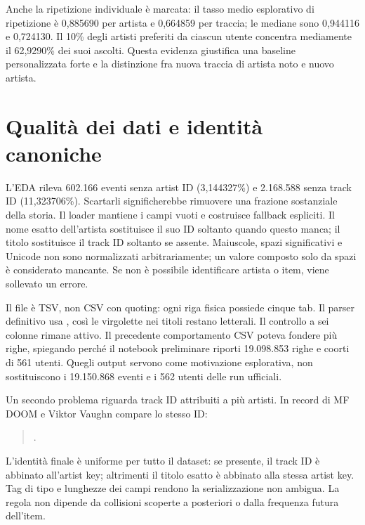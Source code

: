 
Anche la ripetizione individuale è marcata: il tasso medio esplorativo di ripetizione è 0,885690 per artista e 0,664859 per traccia; le mediane sono 0,944116 e 0,724130. Il 10\% degli artisti preferiti da ciascun utente concentra mediamente il 62,9290\% dei suoi ascolti. Questa evidenza giustifica una baseline personalizzata forte e la distinzione fra nuova traccia di artista noto e nuovo artista.

\clearpage
\section{Qualità dei dati e identità canoniche}
L'EDA rileva 602.166 eventi senza artist ID (3,144327\%) e 2.168.588 senza track ID (11,323706\%). Scartarli significherebbe rimuovere una frazione sostanziale della storia. Il loader mantiene i campi vuoti e costruisce fallback espliciti. Il nome esatto dell'artista sostituisce il suo ID soltanto quando questo manca; il titolo sostituisce il track ID soltanto se assente. Maiuscole, spazi significativi e Unicode non sono normalizzati arbitrariamente; un valore composto solo da spazi è considerato mancante. Se non è possibile identificare artista o item, viene sollevato un errore.

Il file è TSV, non CSV con quoting: ogni riga fisica possiede cinque tab. Il parser definitivo usa , così le virgolette nei titoli restano letterali. Il controllo a sei colonne rimane attivo. Il precedente comportamento CSV poteva fondere più righe, spiegando perché il notebook preliminare  riporti 19.098.853 righe e coorti di 561 utenti. Quegli output servono come motivazione esplorativa, non sostituiscono i 19.150.868 eventi e i 562 utenti delle run ufficiali.

Un secondo problema riguarda track ID attribuiti a più artisti. In record di MF DOOM e Viktor Vaughn compare lo stesso ID:
\begin{quote}\small{}.\end{quote}
L'identità finale è uniforme per tutto il dataset: se presente, il track ID è abbinato all'artist key; altrimenti il titolo esatto è abbinato alla stessa artist key. Tag di tipo e lunghezze dei campi rendono la serializzazione non ambigua. La regola non dipende da collisioni scoperte a posteriori o dalla frequenza futura dell'item.

